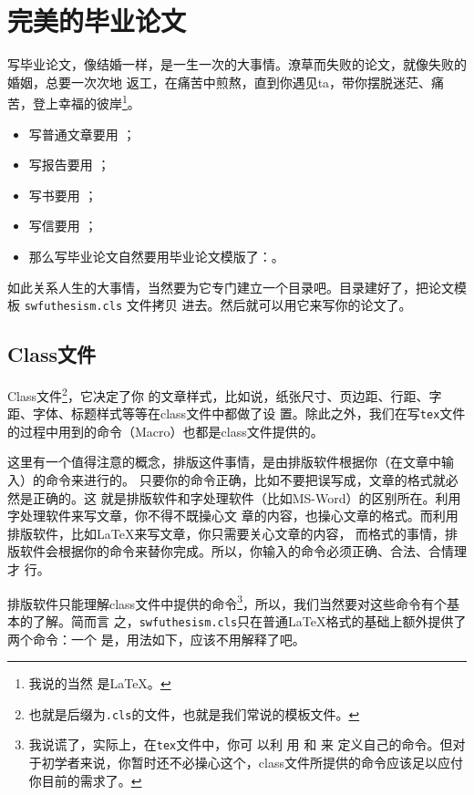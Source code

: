 \chapter{完美的毕业论文}
\label{cha:thesis}

写毕业论文，像结婚一样，是一生一次的大事情。潦草而失败的论文，就像失败的婚姻，总要一次次地
返工，在痛苦中煎熬，直到你遇见ta，带你摆脱迷茫、痛苦，登上幸福的彼岸\footnote{我说的当然
  是\LaTeX{}。}。

\begin{itemize}
\item[] 写普通文章要用 ；
\item[] 写报告要用 ；
\item[] 写书要用 ；
\item[] 写信要用 ；
\item[] 那么写毕业论文自然要用毕业论文模版了：。
\end{itemize}

如此关系人生的大事情，当然要为它专门建立一个目录吧。目录建好了，把论文模板 \texttt{swfuthesism.cls} 文件拷贝
进去。然后就可以用它来写你的论文了。

\section{Class文件}
\label{sec:class}

Class文件\footnote{也就是后缀为\texttt{.cls}的文件，也就是我们常说的模板文件。}，它决定了你
的文章样式，比如说，纸张尺寸、页边距、行距、字距、字体、标题样式等等在class文件中都做了设
置。除此之外，我们在写\texttt{tex}文件的过程中用到的命令（Macro）也都是class文件提供的。

这里有一个值得注意的概念，排版这件事情，是由排版软件根据你（在文章中输入）的命令来进行的。
只要你的命令正确，比如不要把\ltx{\author}误写成\ltx{\auther}，文章的格式就必然是正确的。这
就是排版软件和字处理软件（比如MS-Word）的区别所在。利用字处理软件来写文章，你不得不既操心文
章的内容，也操心文章的格式。而利用排版软件，比如\LaTeX{}来写文章，你只需要关心文章的内容，
而格式的事情，排版软件会根据你的命令来替你完成。所以，你输入的命令必须正确、合法、合情理才
行。

排版软件只能理解class文件中提供的命令\footnote{我说谎了，实际上，在\texttt{tex}文件中，你可
  以利
  用 \ltx{\newcommand{}}和 \ltx{\renewcommand{}}来
  定义自己的命令。但对于初学者来说，你暂时还不必操心这个，class文件所提供的命令应该足以应付
  你目前的需求了。}，所以，我们当然要对这些命令有个基本的了解。简而言
之，\texttt{swfuthesism.cls}只在普通\LaTeX{}格式的基础上额外提供了两个命令：一个
是\ltx{\swfusetup}，用法如下，应该不用解释了吧。

